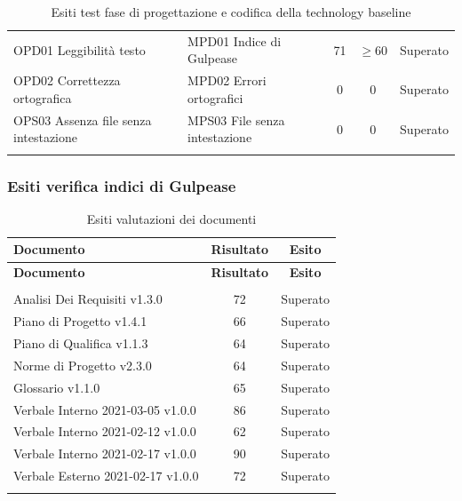 \documentclass[../piano_di_qualifica.tex]{subfiles}
\begin{document}
\begin{center}
\begin{longtable}{|p{4cm}|p{4cm}|c|c|c|}
		OPD01 Leggibilità testo                 & MPD01 Indice di Gulpease      & 71                        & \(\ge 60\)           & Superato       \\
		OPD02 Correttezza ortografica           & MPD02 Errori ortografici      & 0                         & 0                    & Superato       \\
		OPS03 Assenza file senza intestazione   & MPS03 File senza intestazione & 0                         & 0                    & Superato       \\
		\hline
		\rowcolor{white}
		\caption{Esiti test fase di progettazione e codifica della technology baseline}
	\end{longtable}
\end{center}

\subsubsection{Esiti verifica indici di Gulpease}
\label{sub:verif_gul_RP}

\begin{center}
	\begin{longtable}{|l|c|c|}
		\hline
		\rowcolor{lightgray}
		\textbf{Documento}                & \textbf{Risultato} & \textbf{Esito} \\
		\hline
		\endfirsthead

		\hline
		\rowcolor{lightgray}
		\textbf{Documento}                & \textbf{Risultato} & \textbf{Esito} \\
		\hline
		\endhead

		\hline
		\rowcolor{white}
		\multicolumn{3}{|c|}{\emph{Continua alla pagina successiva...}}         \\
		\hline
		\endfoot
		\endlastfoot

		Analisi Dei Requisiti v1.3.0      & 72                 & Superato       \\
		Piano di Progetto v1.4.1          & 66                 & Superato       \\
		Piano di Qualifica v1.1.3         & 64                 & Superato       \\
		Norme di Progetto v2.3.0          & 64                 & Superato       \\
		Glossario v1.1.0                  & 65                 & Superato       \\
		Verbale Interno 2021-03-05 v1.0.0 & 86                 & Superato       \\
		Verbale Interno 2021-02-12 v1.0.0 & 62                 & Superato       \\
		Verbale Interno 2021-02-17 v1.0.0 & 90                 & Superato       \\
		Verbale Esterno 2021-02-17 v1.0.0 & 72                 & Superato       \\
		\hline
		\rowcolor{white}
		\caption{Esiti valutazioni dei documenti}
	\end{longtable}
\end{center}
\end{document}
